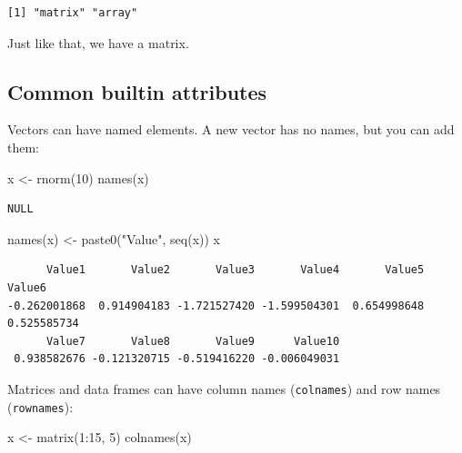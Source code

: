 \documentclass[
]{book}
\newenvironment{Shaded}{\begin{snugshade}}{\end{snugshade}}
\newcommand{\DecValTok}[1]{\textcolor[rgb]{0.00,0.00,0.81}{#1}}
\newcommand{\FunctionTok}[1]{\textcolor[rgb]{0.00,0.00,0.00}{#1}}
\newcommand{\NormalTok}[1]{#1}
\newcommand{\OtherTok}[1]{\textcolor[rgb]{0.56,0.35,0.01}{#1}}
\newcommand{\SpecialCharTok}[1]{\textcolor[rgb]{0.00,0.00,0.00}{#1}}
\newcommand{\StringTok}[1]{\textcolor[rgb]{0.31,0.60,0.02}{#1}}
\begin{document}
\begin{verbatim}
[1] "matrix" "array" 
\end{verbatim}

Just like that, we have a matrix.

\hypertarget{common-builtin-attributes}{%
\subsection{Common builtin attributes}\label{common-builtin-attributes}}

Vectors can have named elements. A new vector has no names, but you can add them:

\begin{Shaded}
\begin{Highlighting}[]
\NormalTok{x }\OtherTok{\textless{}{-}} \FunctionTok{rnorm}\NormalTok{(}\DecValTok{10}\NormalTok{)}
\FunctionTok{names}\NormalTok{(x)}
\end{Highlighting}
\end{Shaded}

\begin{verbatim}
NULL
\end{verbatim}

\begin{Shaded}
\begin{Highlighting}[]
\FunctionTok{names}\NormalTok{(x) }\OtherTok{\textless{}{-}} \FunctionTok{paste0}\NormalTok{(}\StringTok{"Value"}\NormalTok{, }\FunctionTok{seq}\NormalTok{(x))}
\NormalTok{x}
\end{Highlighting}
\end{Shaded}

\begin{verbatim}
      Value1       Value2       Value3       Value4       Value5       Value6 
-0.262001868  0.914904183 -1.721527420 -1.599504301  0.654998648  0.525585734 
      Value7       Value8       Value9      Value10 
 0.938582676 -0.121320715 -0.519416220 -0.006049031 
\end{verbatim}

Matrices and data frames can have column names (\texttt{colnames}) and row names (\texttt{rownames}):

\begin{Shaded}
\begin{Highlighting}[]
\NormalTok{x }\OtherTok{\textless{}{-}} \FunctionTok{matrix}\NormalTok{(}\DecValTok{1}\SpecialCharTok{:}\DecValTok{15}\NormalTok{, }\DecValTok{5}\NormalTok{)}
\FunctionTok{colnames}\NormalTok{(x)}
\end{Highlighting}
\end{Shaded}
\end{document}
